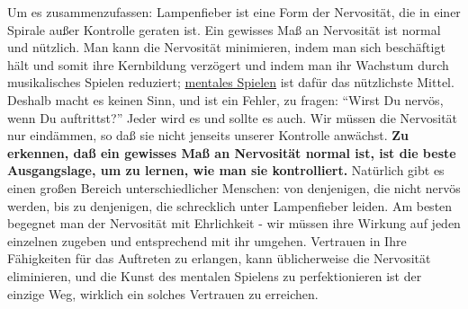Um es zusammenzufassen: Lampenfieber ist eine Form der Nervosität, die in einer Spirale außer Kontrolle geraten ist.
Ein gewisses Maß an Nervosität ist normal und nützlich.
Man kann die Nervosität minimieren, indem man sich beschäftigt hält und somit ihre Kernbildung verzögert und indem man ihr Wachstum durch musikalisches Spielen reduziert; \hyperref[c1ii12mental]{mentales Spielen} ist dafür das nützlichste Mittel.
Deshalb macht es keinen Sinn, und ist ein Fehler, zu fragen: \enquote{Wirst Du nervös, wenn Du auftrittst?}
Jeder wird es und sollte es auch.
Wir müssen die Nervosität nur eindämmen, so daß sie nicht jenseits unserer Kontrolle anwächst.
\textbf{Zu erkennen, daß ein gewisses Maß an Nervosität normal ist, ist die beste Ausgangslage, um zu lernen, wie man sie kontrolliert.}
Natürlich gibt es einen großen Bereich unterschiedlicher Menschen: von denjenigen, die nicht nervös werden, bis zu denjenigen, die schrecklich unter Lampenfieber leiden.
Am besten begegnet man der Nervosität mit Ehrlichkeit - wir müssen ihre Wirkung auf jeden einzelnen zugeben und entsprechend mit ihr umgehen.
Vertrauen in Ihre Fähigkeiten für das Auftreten zu erlangen, kann üblicherweise die Nervosität eliminieren, und die Kunst des mentalen Spielens zu perfektionieren ist der einzige Weg, wirklich ein solches Vertrauen zu erreichen.



